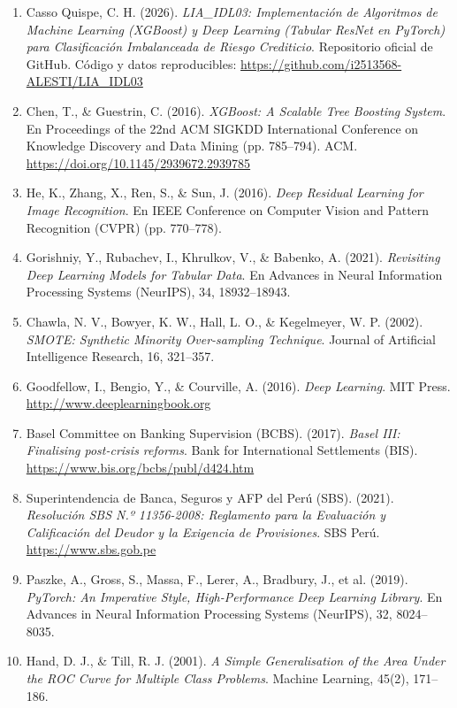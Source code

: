 \documentclass[11pt,a4paper]{article}
\begin{document}
\begin{enumerate}[leftmargin=1.2cm]
    \item Casso Quispe, C. H. (2026). \textit{LIA\_IDL03: Implementación de Algoritmos de Machine Learning (XGBoost) y Deep Learning (Tabular ResNet en PyTorch) para Clasificación Imbalanceada de Riesgo Crediticio}. Repositorio oficial de GitHub. Código y datos reproducibles: \url{https://github.com/i2513568-ALESTI/LIA_IDL03}
    \item Chen, T., \& Guestrin, C. (2016). \textit{XGBoost: A Scalable Tree Boosting System}. En Proceedings of the 22nd ACM SIGKDD International Conference on Knowledge Discovery and Data Mining (pp. 785–794). ACM. \url{https://doi.org/10.1145/2939672.2939785}
    \item He, K., Zhang, X., Ren, S., \& Sun, J. (2016). \textit{Deep Residual Learning for Image Recognition}. En IEEE Conference on Computer Vision and Pattern Recognition (CVPR) (pp. 770–778).
    \item Gorishniy, Y., Rubachev, I., Khrulkov, V., \& Babenko, A. (2021). \textit{Revisiting Deep Learning Models for Tabular Data}. En Advances in Neural Information Processing Systems (NeurIPS), 34, 18932–18943.
    \item Chawla, N. V., Bowyer, K. W., Hall, L. O., \& Kegelmeyer, W. P. (2002). \textit{SMOTE: Synthetic Minority Over-sampling Technique}. Journal of Artificial Intelligence Research, 16, 321–357.
    \item Goodfellow, I., Bengio, Y., \& Courville, A. (2016). \textit{Deep Learning}. MIT Press. \url{http://www.deeplearningbook.org}
    \item Basel Committee on Banking Supervision (BCBS). (2017). \textit{Basel III: Finalising post-crisis reforms}. Bank for International Settlements (BIS). \url{https://www.bis.org/bcbs/publ/d424.htm}
    \item Superintendencia de Banca, Seguros y AFP del Perú (SBS). (2021). \textit{Resolución SBS N.º 11356-2008: Reglamento para la Evaluación y Calificación del Deudor y la Exigencia de Provisiones}. SBS Perú. \url{https://www.sbs.gob.pe}
    \item Paszke, A., Gross, S., Massa, F., Lerer, A., Bradbury, J., et al. (2019). \textit{PyTorch: An Imperative Style, High-Performance Deep Learning Library}. En Advances in Neural Information Processing Systems (NeurIPS), 32, 8024–8035.
    \item Hand, D. J., \& Till, R. J. (2001). \textit{A Simple Generalisation of the Area Under the ROC Curve for Multiple Class Problems}. Machine Learning, 45(2), 171–186.
\end{enumerate}
\end{document}
